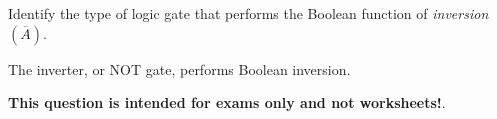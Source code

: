 

Identify the type of logic gate that performs the Boolean function of {\it inversion} $(\overline{A})$.







The inverter, or NOT gate, performs Boolean inversion.







{\bf This question is intended for exams only and not worksheets!}.




